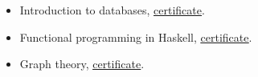 \begin{itemize}

\item Introduction to databases, \href{https://stepik.org/cert/336064}
{\underline{certificate}}.

\item Functional programming in Haskell,
\href{https://stepik.org/cert/272055}
{\underline{certificate}}.

\item Graph theory,
\href{https://coursera.org/share/713ce9741f5f39a7c4d56af9d5e9b60e}
{\underline{certificate}}.

\end{itemize}
